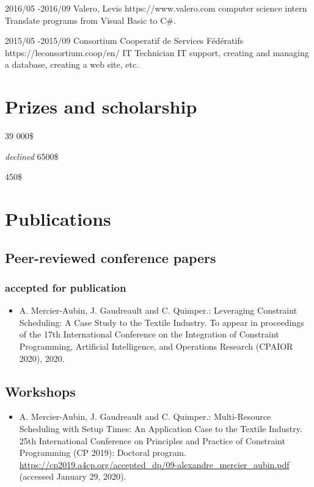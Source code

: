 \documentclass[10pt]{article} %
\begin{document}
\job
{2016/05 -}{2016/09}
{Valero, Levis}
{https://www.valero.com}
{computer science intern}
{Translate programs from Visual Basic to C\#.}

\job
{2015/05 -}{2015/09}
{Consortium Cooperatif de Services Fédératifs}
{https://leconsortium.coop/en/}
{IT Technician}
{IT support, creating and managing a database, creating a web site, etc.}


\section{Prizes and scholarship}

{
\textit{} 39 000\$\\
}

{
\textit{declined} 6500\$\\
}

{
\textit{} 450\$\\
}

\section{Publications}
\subsection{Peer-reviewed conference papers}
\subsubsection{accepted for publication}
\begin{itemize}

\item
A. Mercier-Aubin, J. Gaudreault and C. Quimper.: Leveraging Constraint Scheduling: A Case Study
to the Textile Industry. To appear in proceedings of the 17th International Conference on the Integration of Constraint Programming, Artificial Intelligence, and Operations Research (CPAIOR 2020), 2020.

\end{itemize}
\subsection{Workshops}
\begin{itemize}

\item
A. Mercier-Aubin, J. Gaudreault and C. Quimper.: Multi-Resource Scheduling with Setup Times: An Application Case to the Textile Industry. 25th International Conference on Principles and Practice of Constraint Programming (CP 2019): Doctoral program.
\url{https://cp2019.a4cp.org/accepted_dp/09-alexandre_mercier_aubin.pdf} (accessed January 29, 2020).

\end{itemize}
\end{document}
